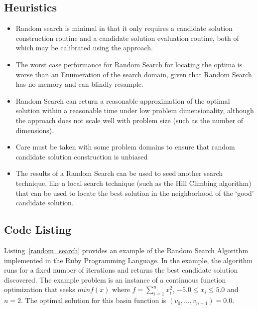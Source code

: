 \subsection{Heuristics}
\begin{itemize}
	\item Random search is minimal in that it only requires a candidate solution construction routine and a candidate solution evaluation routine, both of which may be calibrated using the approach.
	\item The worst case performance for Random Search for locating the optima is worse than an Enumeration of the search domain, given that Random Search has no memory and can blindly resample.
	\item Random Search can return a reasonable approximation of the optimal solution within a reasonable time under low problem dimensionality, although the approach does not scale well with problem size (such as the number of dimensions).
	\item Care must be taken with some problem domains to ensure that random candidate solution construction is  unbiased
	\item The results of a Random Search can be used to seed another search technique, like a local search technique (such as the Hill Climbing algorithm) that can be used to locate the best solution in the neighborhood of the `good' candidate solution.
\end{itemize}

\subsection{Code Listing}
Listing~\ref{random_search} provides an example of the Random Search Algorithm implemented in the Ruby Programming Language. 
In the example, the algorithm runs for a fixed number of iterations and returns the best candidate solution discovered. 
The example problem is an instance of a continuous function optimization that seeks $min f(x)$ where $f=\sum_{i=1}^n x_{i}^2$, $-5.0\leq x_i \leq 5.0$ and $n=2$. The optimal solution for this basin function is $(v_0,\ldots,v_{n-1})=0.0$.

